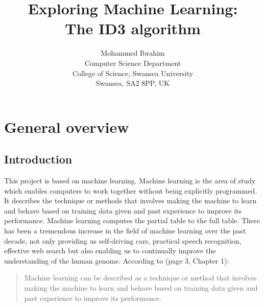 \documentclass{report}
\begin{document}
\title{Exploring Machine Learning:\\
  The ID3 algorithm}

\author{Mohammed Ibrahim\\
 Computer Science Department\\
  College of Science, Swansea University\\
  Swansea, SA2 8PP, UK
}

\maketitle
\tableofcontents


\chapter{General overview}
\label{cha:genoverview}


\section{Introduction}
\label{sec:int}

This project is based on machine learning. Machine learning is the area of study which enables computers to work together without being explicitly programmed. It describes the technique or methods that involves making the machine to learn and behave based on training data given and past experience to improve its performance. Machine learning computes the partial table to the full table.
There has been a tremendous increase in the field of machine learning over the past decade, not only providing us self-driving cars, practical speech recognition,  effective web search but also enabling us to continually improve the understanding of the human genome. According to \cite{Alpaydin2010MachineLearning}(page 3, Chapter 1):
\begin{quote}
  Machine learning can be described as a technique or method that involves making the machine to learn and behave based on training data given and past experience to improve its performance.
\end{quote}
\end{document}
